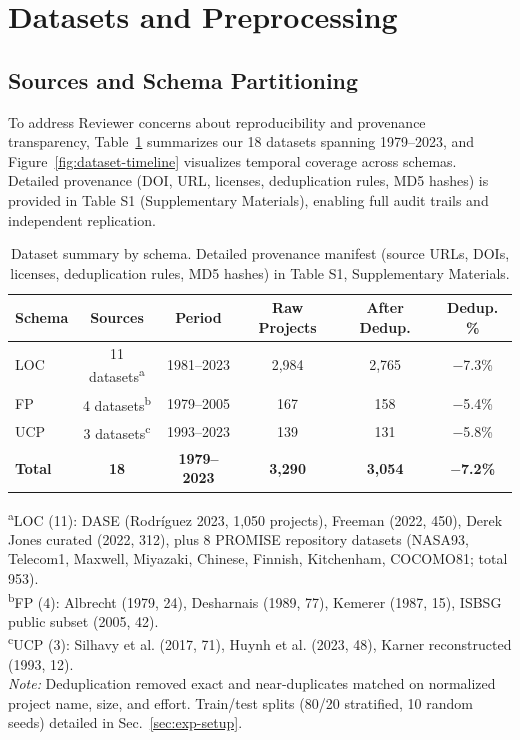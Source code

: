 \documentclass{ieeeaccess}
\begin{document}
\section{Datasets and Preprocessing}
\subsection{Sources and Schema Partitioning}
\label{sec:dataset-manifest}

To address Reviewer concerns about reproducibility and provenance transparency, Table~\ref{tab:dataset-summary} summarizes our 18 datasets spanning 1979--2023, and Figure~\ref{fig:dataset-timeline} visualizes temporal coverage across schemas. Detailed provenance (DOI, URL, licenses, deduplication rules, MD5 hashes) is provided in Table S1 (Supplementary Materials), enabling full audit trails and independent replication.

\begin{table}[h]
\centering
\caption{Dataset summary by schema. Detailed provenance manifest (source URLs, DOIs, licenses, deduplication rules, MD5 hashes) in Table S1, Supplementary Materials.}
\label{tab:dataset-summary}
\small
\begin{tabular}{l c c c c c}
\toprule
\textbf{Schema} & \textbf{Sources} & \textbf{Period} & \textbf{Raw Projects} & \textbf{After Dedup.} & \textbf{Dedup. \%} \\
\midrule
LOC & 11 datasets\textsuperscript{a} & 1981--2023 & 2,984 & 2,765 & $-$7.3\% \\
FP  & 4 datasets\textsuperscript{b}  & 1979--2005 & 167   & 158   & $-$5.4\% \\
UCP & 3 datasets\textsuperscript{c}  & 1993--2023 & 139   & 131   & $-$5.8\% \\
\midrule
\textbf{Total} & \textbf{18} & \textbf{1979--2023} & \textbf{3,290} & \textbf{3,054} & \textbf{$-$7.2\%} \\
\bottomrule
\end{tabular}
\vspace{0.3em}
\raggedright\footnotesize
\textsuperscript{a}LOC (11): DASE (Rodríguez 2023, 1,050 projects), Freeman (2022, 450), Derek Jones curated (2022, 312), plus 8 PROMISE repository datasets (NASA93, Telecom1, Maxwell, Miyazaki, Chinese, Finnish, Kitchenham, COCOMO81; total 953). \\
\textsuperscript{b}FP (4): Albrecht (1979, 24), Desharnais (1989, 77), Kemerer (1987, 15), ISBSG public subset (2005, 42). \\
\textsuperscript{c}UCP (3): Silhavy et al. (2017, 71), Huynh et al. (2023, 48), Karner reconstructed (1993, 12). \\
\textit{Note:} Deduplication removed exact and near-duplicates matched on normalized project name, size, and effort. Train/test splits (80/20 stratified, 10 random seeds) detailed in Sec.~\ref{sec:exp-setup}.
\end{table}
\end{document}
